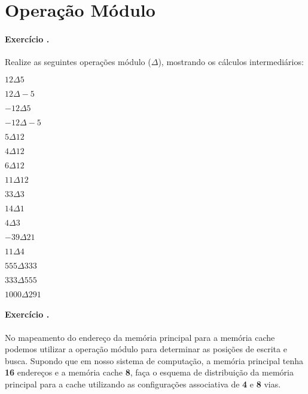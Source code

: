 \setcounter{exno}{0}
\def\exerc{\paragraph{Exercício \arabic{exno}.}
  \addtocounter{exno}{1}}


\section*{Operação Módulo}

\def\modsym{\Delta} \def\mod#1#2{$#1\modsym#2$} \exerc{} Realize as
seguintes operações módulo ($\modsym$), mostrando os cálculos 
intermediários:

\begin{enumerate}[(a)]
\begin{minipage}{.5\textwidth}
\item \mod{12}{5}
\item \mod{12}{-5}
\item \mod{-12}{5}
\item \mod{-12}{-5}
\item \mod{5}{12}
\item \mod{4}{12}
\item \mod{6}{12}
\item \mod{11}{12}
\end{minipage}
\begin{minipage}{.5\textwidth}
\item \mod{33}{3}
\item \mod{14}{1}
\item \mod{4}{3}
\item \mod{-39}{21}
\item \mod{11}{4}
\item \mod{555}{333}
\item \mod{333}{555}
\item \mod{1000}{291}
\end{minipage}
\end{enumerate}

\exerc{} No mapeamento do endereço da memória principal para a memória
cache podemos utilizar a operação módulo para determinar as posições
de escrita e busca. Supondo que em nosso sistema de computação, a
memória principal tenha {\bf 16} endereços e a memória cache {\bf 8},
faça o esquema de distribuição da memória principal para a cache
utilizando as configurações associativa de {\bf 4} e {\bf 8} vias.


